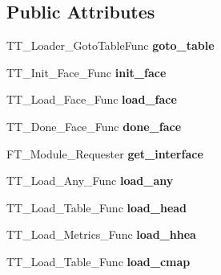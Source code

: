 \subsection*{Public Attributes}
\begin{DoxyCompactItemize}
\item 
\mbox{\label{structSFNT__Interface___aee5cacbd128dd48ddf73ab6eb8d89500}} 
T\+T\+\_\+\+Loader\+\_\+\+Goto\+Table\+Func {\bfseries goto\+\_\+table}
\item 
\mbox{\label{structSFNT__Interface___a9ec559df25a7bd65db0c1c4df8554321}} 
T\+T\+\_\+\+Init\+\_\+\+Face\+\_\+\+Func {\bfseries init\+\_\+face}
\item 
\mbox{\label{structSFNT__Interface___ad87a982ddabe05f0d15330aec54f7597}} 
T\+T\+\_\+\+Load\+\_\+\+Face\+\_\+\+Func {\bfseries load\+\_\+face}
\item 
\mbox{\label{structSFNT__Interface___a4066721e7bb91b28819b5e673fa406bb}} 
T\+T\+\_\+\+Done\+\_\+\+Face\+\_\+\+Func {\bfseries done\+\_\+face}
\item 
\mbox{\label{structSFNT__Interface___a417552cced1058aeba30fd485fd838e2}} 
F\+T\+\_\+\+Module\+\_\+\+Requester {\bfseries get\+\_\+interface}
\item 
\mbox{\label{structSFNT__Interface___a9497a7c23efc4a27124b72f794167f33}} 
T\+T\+\_\+\+Load\+\_\+\+Any\+\_\+\+Func {\bfseries load\+\_\+any}
\item 
\mbox{\label{structSFNT__Interface___af4e699f29f305ac50a3e35abda888936}} 
T\+T\+\_\+\+Load\+\_\+\+Table\+\_\+\+Func {\bfseries load\+\_\+head}
\item 
\mbox{\label{structSFNT__Interface___a8e24e72f3a69f8c4415a1f9e433da08f}} 
T\+T\+\_\+\+Load\+\_\+\+Metrics\+\_\+\+Func {\bfseries load\+\_\+hhea}
\item 
\mbox{\label{structSFNT__Interface___a3390e643937228ada5f1097c5598b851}} 
T\+T\+\_\+\+Load\+\_\+\+Table\+\_\+\+Func {\bfseries load\+\_\+cmap}

\end{DoxyCompactItemize}
